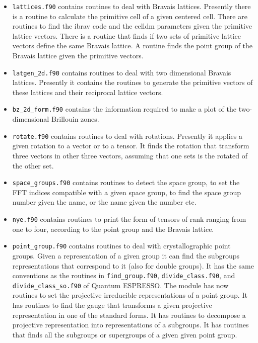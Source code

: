 \documentclass[12pt,a4paper]{article}
\def\qe{{\sc Quantum ESPRESSO}}
\begin{document}
\begin{itemize}

\item \texttt{lattices.f90} contains routines to deal with Bravais lattices.
Presently there is a routine to calculate the primitive cell of
a given centered cell. There are routines to find the ibrav code and the
celldm parameters given the primitive lattice vectors. There is a routine
that finds if two sets of primitive lattice vectors define the same 
Bravais lattice. A routine finds the point group of the Bravais lattice
given the primitive vectors.

\item
\texttt{latgen\_2d.f90} contains routines to deal with two dimensional
Bravais lattices. Presently it contains the routines to generate the
primitive vectors of these lattices and their reciprocal lattice vectors.

\item
\texttt{bz\_2d\_form.f90} contains the information required to make a
plot of the two-dimensional Brillouin zones.

\item
\texttt{rotate.f90} contains routines to deal with rotations. Presently it
applies a given rotation to a vector or to a tensor.
It finds the rotation that transform three vectors in other three vectors,
assuming that one sets is the rotated of the other set.

\item
\texttt{space\_groups.f90} contains routines to detect the space group,
to set the FFT indices compatible with a given space group, to find the
space group number given the name, or the name given the number etc.

\item
\texttt{nye.f90} contains routines to print the form of tensors of
rank ranging from one to four, according to the point group and the
Bravais lattice.


\item
\texttt{point\_group.f90} contains routines to deal with crystallographic
point groups. Given a representation of a given group it can find 
the subgroups representations that correspond to it (also for
double groups). It has the same conventions as the routines 
in \texttt{find\_group.f90}, \texttt{divide\_class.f90}, and 
\texttt{divide\_class\_so.f90} of \qe. The module has now routines to
set the projective irreducible representations of a point group.
It has routines to find the gauge that transforms a given projective
representation in one of the standard forms. It has routines to decompose
a projective representation into representations of a subgroups.
It has routines that finds all the subgroups or supergroups of a given given
point group.


\end{itemize}
\end{document}

